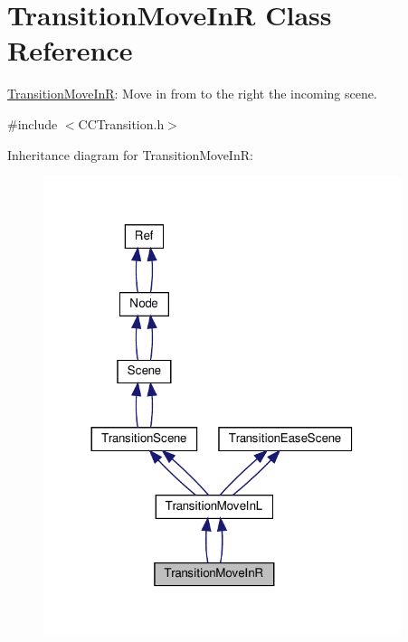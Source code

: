 \hypertarget{classTransitionMoveInR}{}\section{Transition\+Move\+InR Class Reference}
\label{classTransitionMoveInR}


\hyperlink{classTransitionMoveInR}{Transition\+Move\+InR}\+: Move in from to the right the incoming scene.  




{\ttfamily \#include $<$C\+C\+Transition.\+h$>$}



Inheritance diagram for Transition\+Move\+InR\+:
\nopagebreak
\begin{figure}[H]
\begin{center}
\leavevmode
\includegraphics[width=296pt]{classTransitionMoveInR__inherit__graph}
\end{center}
\end{figure}


